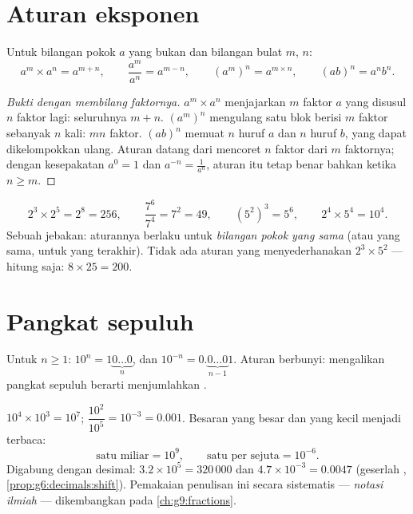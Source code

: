 \section{Aturan eksponen}

\begin{theorem}\label{thm:g8:powers:rules}
Untuk bilangan pokok $a$ yang bukan  dan  bilangan bulat $m$, $n$:
\[
a^m \times a^n = a^{m+n},
\qquad
\frac{a^m}{a^n} = a^{m-n},
\qquad
\left(a^m\right)^n = a^{m \times n},
\qquad
(ab)^n = a^n b^n .
\]
\end{theorem}

\begin{proof}[Bukti dengan membilang faktornya]
$a^m \times a^n$ menjajarkan $m$ faktor $a$ yang disusul $n$ faktor
lagi: seluruhnya $m + n$. $\left(a^m\right)^n$ mengulang satu blok
berisi $m$ faktor sebanyak $n$ kali: $mn$ faktor. $(ab)^n$ memuat $n$
huruf $a$ dan $n$ huruf $b$, yang dapat dikelompokkan ulang. Aturan
 datang dari mencoret $n$ faktor dari $m$ faktornya;
dengan kesepakatan $a^0 = 1$ dan $a^{-n} = \frac{1}{a^n}$, aturan itu
tetap benar bahkan ketika $n \geq m$.
\end{proof}

\begin{example}\label{ex:g8:powers:rules}
\[
2^3 \times 2^5 = 2^8 = 256,
\qquad
\frac{7^6}{7^4} = 7^2 = 49,
\qquad
\left(5^2\right)^3 = 5^6,
\qquad
2^4 \times 5^4 = 10^4 .
\]
Sebuah jebakan: aturannya berlaku untuk \emph{bilangan pokok yang
sama} (atau  yang sama, untuk yang terakhir). Tidak ada aturan
yang menyederhanakan $2^3 \times 5^2$ --- hitung saja:
$8 \times 25 = 200$.
\end{example}

\section{Pangkat sepuluh}

\begin{proposition}\label{prop:g8:powers:ten}
Untuk $n \geq 1$: $10^n = 1\underbrace{0\dots0}_{n}$, dan
$10^{-n} = 0.\underbrace{0\dots0}_{n-1}1$. Aturan 
berbunyi: mengalikan pangkat sepuluh berarti menjumlahkan .
\end{proposition}

\begin{example}\label{ex:g8:powers:ten}
$10^4 \times 10^3 = 10^7$; \quad
$\dfrac{10^2}{10^5} = 10^{-3} = 0.001$. Besaran yang besar dan yang
kecil menjadi terbaca:
\[
\text{satu miliar} = 10^9,
\qquad
\text{satu per sejuta} = 10^{-6}.
\]
Digabung dengan desimal: $3.2 \times 10^5 = 320\,000$ dan
$4.7 \times 10^{-3} = 0.0047$ (geserlah ,
\cref{prop:g6:decimals:shift}). Pemakaian penulisan ini secara
sistematis --- \emph{notasi ilmiah} --- dikembangkan pada
\cref{ch:g9:fractions}.
\end{example}

